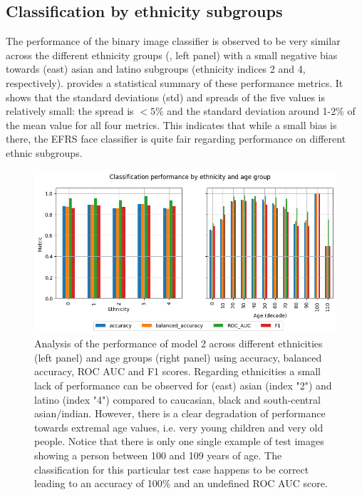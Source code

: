 \documentclass{article}
\begin{document}
\subsection{Classification by ethnicity subgroups}
The performance of the binary image classifier is observed to be very similar across the different ethnicity groups (, left panel) with a small negative bias towards (east) asian and latino subgroups (ethnicity indices 2 and 4, respectively).  provides a statistical summary of these performance metrics. It shows that the standard deviations (std) and spreads of the five values is relatively small: the spread is $<5\%$ and the standard deviation around 1-2\% of the mean value for all four metrics. This indicates that while a small bias is there, the EFRS face classifier is quite fair regarding performance on different ethnic subgroups.
\begin{figure}[t!]
  \centering
  \includegraphics[width=\textwidth]{imgs/cls_performance_analysis__mynet_gender_002.png}
  \caption{Analysis of the performance of model 2 across different ethnicities (left panel) and age groups (right panel) using accuracy, balanced accuracy, ROC AUC and F1 scores. Regarding ethnicities a small lack of performance can be observed for (east) asian (index "2") and latino (index "4") compared to caucasian, black and south-central asian/indian. However, there is a clear degradation of performance towards extremal age values, i.e. very young children and very old people. Notice that there is only one single example of test images showing a person between 100 and 109 years of age. The classification for this particular test case happens to be correct leading to an accuracy of 100\% and an undefined ROC AUC score.}
  \label{fig:subgroupbreakdown}
\end{figure}
\end{document}
